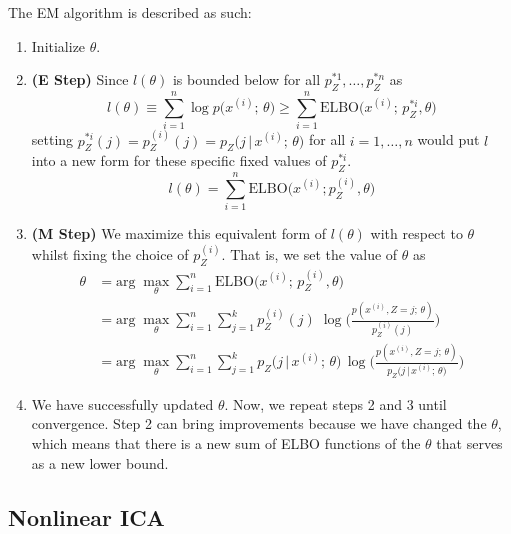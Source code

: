 \begin{definition}
    The EM algorithm is described as such: 
    \begin{enumerate}
      \item Initialize $\theta$.
      \item \textbf{(E Step)} Since $l(\theta)$ is bounded below for all $p_Z^{*1}, \ldots, p_Z^{*n}$ as 
        \[l(\theta) \equiv \sum_{i=1}^n \log p\big( x^{(i)}; \, \theta\big) \geq \sum_{i=1}^n \text{ELBO}\big( x^{(i)}; \, p_Z^{*i}, \theta\big)\]
      setting $p_Z^{*i} (j) = p_Z^{(i)} (j) = p_Z \big(j\,|\, x^{(i)}; \, \theta\big)$ for all $i = 1, \ldots, n$ would put $l$ into a new form for these specific fixed values of $p_Z^{*i}$. 
        \[l(\theta) = \sum_{i=1}^n \text{ELBO}\big(x^{(i)}; p_Z^{(i)}, \theta \big)\]
      \item \textbf{(M Step)} We maximize this equivalent form of $l(\theta)$ with respect to $\theta$ whilst fixing the choice of $p_Z^{(i)}$. That is, we set the value of $\theta$ as 
      \begin{align*}  
        \theta & = \text{arg}\; \max_\theta \sum_{i=1}^n \text{ELBO} \big( x^{(i)}; \, p_Z^{(i)}, \theta \big) \\
        & = \text{arg}\; \max_\theta \sum_{i=1}^n \sum_{j=1}^k p_Z^{(i)} (j)\; \log \bigg( \frac{p(x^{(i)}, Z = j; \, \theta)}{p_Z^{(i)} (j)} \bigg) \\
        & = \text{arg}\; \max_\theta \sum_{i=1}^n \sum_{j = 1}^k p_Z \big(j\,|\, x^{(i)}; \, \theta \big)\, \log \bigg( \frac{p(x^{(i)}, Z = j; \, \theta)}{p_Z \big(j\,|\, x^{(i)}; \, \theta \big)} \bigg)
      \end{align*}
      \item We have successfully updated $\theta$. Now, we repeat steps 2 and 3 until convergence. Step 2 can bring improvements because we have changed the $\theta$, which means that there is a new sum of ELBO functions of the $\theta$ that serves as a new lower bound.
    \end{enumerate}
  \end{definition}

\subsection{Nonlinear ICA} 
